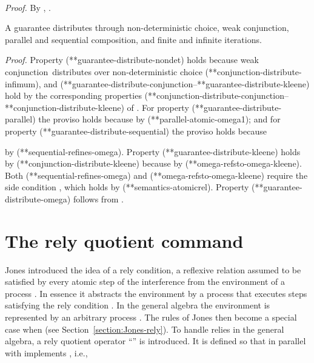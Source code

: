 \documentclass[fleqn]{fac}
\makeatletter
\renewenvironment{proof}{\noindent \textit{Proof.}}{\noindent\par}
\def\refaxiom{\@ifnextchar*{\@refaxiom}{\@@refaxiom}}
\def\@refaxiom*#1{\ref{axiom-#1}\index{Axiom!#1|LawUse}}
\def\@@refaxiom#1{axiom~(\ref{axiom-#1})\index{Axiom!#1|LawUse}}
\def\refproperty{\@ifnextchar*{\@refproperty}{\@@refproperty}}
\def\@refproperty*#1{\ref{property-#1}\index{Property!#1|LawUse}}
\def\@@refproperty#1{property~(\ref{property-#1})\index{Property!#1|LawUse}}
\newcommand{\strictconjunction}{weak conjunction}
\makeatother
\begin{document}
\begin{definitionx}[iteration]
\begin{lemmax}[induction]
\begin{lawx}~~~

\end{lawx}

\begin{proof}
By , 
.
\end{proof}




A guarantee distributes through 
non-deterministic choice, \strictconjunction, parallel and sequential composition,
and finite and infinite iterations.
\begin{lawx}

\end{lawx}

\begin{proof}
Property (\refproperty*{guarantee-distribute-nondet}) holds because \strictconjunction\ distributes over non-deterministic choice 
(\refaxiom*{conjunction-distribute-infimum}),
and (\refproperty*{guarantee-distribute-conjunction}--\refproperty*{guarantee-distribute-kleene}) 
hold by the corresponding properties (\refproperty*{conjunction-distribute-conjunction}--\refproperty*{conjunction-distribute-kleene}) of .
For property (\refproperty*{guarantee-distribute-parallel}) the proviso holds 
because 
by (\refproperty*{parallel-atomic-omega1});
and
for property (\refproperty*{guarantee-distribute-sequential}) the proviso holds because

by (\refproperty*{sequential-refines-omega}).
Property (\refproperty*{guarantee-distribute-kleene}) holds by (\refproperty*{conjunction-distribute-kleene}) 
because  by (\refproperty*{omega-refsto-omega-kleene}).
Both (\refproperty*{sequential-refines-omega}) and (\refproperty*{omega-refsto-omega-kleene})
require the side condition ,
which holds by (\refproperty*{semantics-atomicrel}).
Property (\refproperty*{guarantee-distribute-omega}) follows from .
\end{proof}






\section{The rely quotient command}\label{section:rely}

Jones introduced the idea of a rely condition,
a reflexive relation assumed to be satisfied by 
every atomic step of the interference from the environment of a process \cite{jon83a}.
In essence it abstracts the environment by a process  
that executes steps satisfying the rely condition .
In the general algebra the environment is represented by an arbitrary process .
The rules of Jones then become a special case 
when  (see Section~\ref{section:Jones-rely}).
To handle relies in the general algebra, a rely quotient operator ``'' is introduced.
It is defined so that  in parallel with  implements ,
i.e.,


\end{lemmax}
\end{definitionx}
\end{document}

